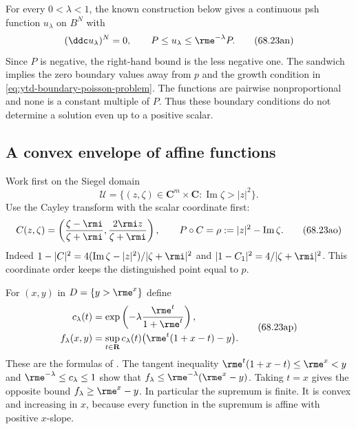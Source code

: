 For every $0<\lambda<1$, the known construction below gives a continuous
psh function $u_\lambda$ on $B^N$ with
\[
 (\ddc u_\lambda)^N=0,\qquad
 P\leq u_\lambda\leq\rme^{-\lambda}P.
\tag{68.23an}\label{eq:ytd-boundary-poisson-family}
\]
Since $P$ is negative, the right-hand bound is the less negative one.
The sandwich implies the zero boundary values away from $p$ and the
growth condition in \eqref{eq:ytd-boundary-poisson-problem}.
The functions are pairwise nonproportional and none is a constant
multiple of $P$. Thus these boundary conditions do not determine a
solution even up to a positive scalar.

\subsection{A convex envelope of affine functions}
\label{sec:ytd-boundary-poisson-envelope}

Work first on the Siegel domain
\[
 \mathcal U=\{(z,\zeta)\in\mathbf C^m\times\mathbf C:
                  \operatorname{Im}\zeta>|z|^2\}.
\]
Use the Cayley transform with the scalar coordinate first:
\[
 C(z,\zeta)=\left(\frac{\zeta-\rmi}{\zeta+\rmi},
                         \frac{2\rmi z}{\zeta+\rmi}\right),
 \qquad P\circ C=\rho:=|z|^2-\operatorname{Im}\zeta.
\tag{68.23ao}\label{eq:ytd-boundary-poisson-cayley}
\]
Indeed $1-|C|^2=4(\operatorname{Im}\zeta-|z|^2)/|\zeta+\rmi|^2$
and $|1-C_1|^2=4/|\zeta+\rmi|^2$. This coordinate order keeps the
distinguished point equal to $p$.

For $(x,y)$ in $D=\{y>\rme^x\}$ define
\[
\begin{aligned}
 c_\lambda(t)&=\exp\left(-\lambda\frac{\rme^t}{1+\rme^t}\right),\\
 f_\lambda(x,y)&=\sup_{t\in\mathbf R}
          c_\lambda(t)\bigl(\rme^t(1+x-t)-y\bigr).
\end{aligned}
\tag{68.23ap}\label{eq:ytd-boundary-poisson-convex-envelope}
\]
These are the formulas of \cite[(3.1) and Lemmas~3.2--3.3]{Wang26PoissonV1}.
The tangent inequality $\rme^t(1+x-t)\leq\rme^x<y$ and
$\rme^{-\lambda}\leq c_\lambda\leq1$ show that
$f_\lambda\leq\rme^{-\lambda}(\rme^x-y)$.
Taking $t=x$ gives the opposite bound
$f_\lambda\geq\rme^x-y$. In particular the supremum is finite.
It is convex and increasing in $x$, because every function in the
supremum is affine with positive $x$-slope.

